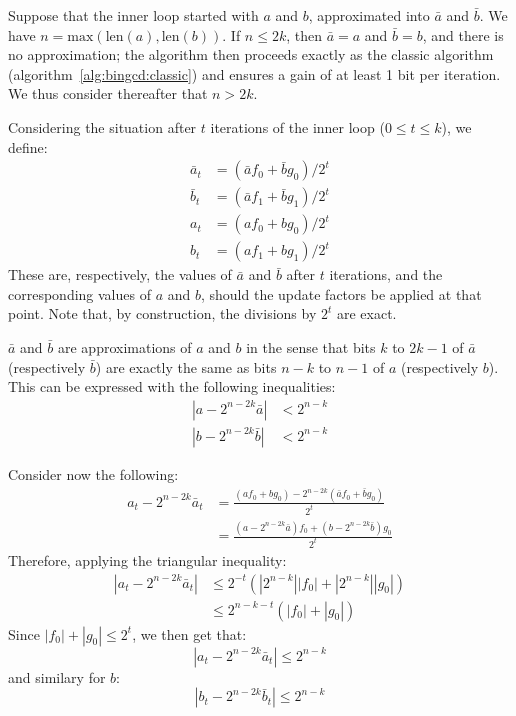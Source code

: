 \documentclass{llncs}
\newcommand{\bitlength}{\text{len}}
\begin{document}
Suppose that the inner loop started with $a$ and $b$, approximated into
$\bar a$ and $\bar b$. We have $n = \text{max}(\bitlength(a),
\bitlength(b))$. If $n \leq 2k$, then $\bar a = a$ and $\bar b = b$, and
there is no approximation; the algorithm then proceeds exactly as the
classic algorithm (algorithm~\ref{alg:bingcd:classic}) and ensures a
gain of at least 1 bit per iteration. We thus consider thereafter that
$n > 2k$.

Considering the situation after $t$ iterations of the inner loop
($0\leq t\leq k$), we define:
\begin{align*}
    \bar a_t &= (\bar a f_0 + \bar b g_0)/2^t \\
    \bar b_t &= (\bar a f_1 + \bar b g_1)/2^t \\
    a_t &= (a f_0 + b g_0)/2^t \\
    b_t &= (a f_1 + b g_1)/2^t
\end{align*}
These are, respectively, the values of $\bar a$ and $\bar b$ after $t$
iterations, and the corresponding values of $a$ and $b$, should the
update factors be applied at that point. Note that, by construction, the
divisions by $2^t$ are exact.

$\bar a$ and $\bar b$ are approximations of $a$ and $b$ in the sense that
bits $k$ to $2k-1$ of $\bar a$ (respectively $\bar b$) are exactly the
same as bits $n-k$ to $n-1$ of $a$ (respectively $b$). This can be
expressed with the following inequalities:
\begin{align*}
    |a - 2^{n-2k} \bar a| &< 2^{n-k} \\
    |b - 2^{n-2k} \bar b| &< 2^{n-k}
\end{align*}

Consider now the following:
\begin{align*}
    a_t - 2^{n-2k} \bar a_t
        &= \frac{(af_0 + bg_0) - 2^{n-2k}(\bar a f_0 + \bar b g_0)}{2^t} \\
        &= \frac{(a - 2^{n-2k} \bar a)f_0 + (b - 2^{n-2k} \bar b)g_0}{2^t}
\end{align*}
Therefore, applying the triangular inequality:
\begin{align*}
    |a_t - 2^{n-2k} \bar a_t|
        &\leq 2^{-t} (|2^{n-k}| |f_0| + |2^{n-k}| |g_0|) \\
        &\leq 2^{n-k-t} (|f_0| + |g_0|)
\end{align*}
Since $|f_0| + |g_0| \leq 2^t$, we then get that:
\begin{equation*}
    |a_t - 2^{n-2k} \bar a_t| \leq 2^{n-k}
\end{equation*}
and similary for $b$:
\begin{equation*}
    |b_t - 2^{n-2k} \bar b_t| \leq 2^{n-k}
\end{equation*}
\end{document}
